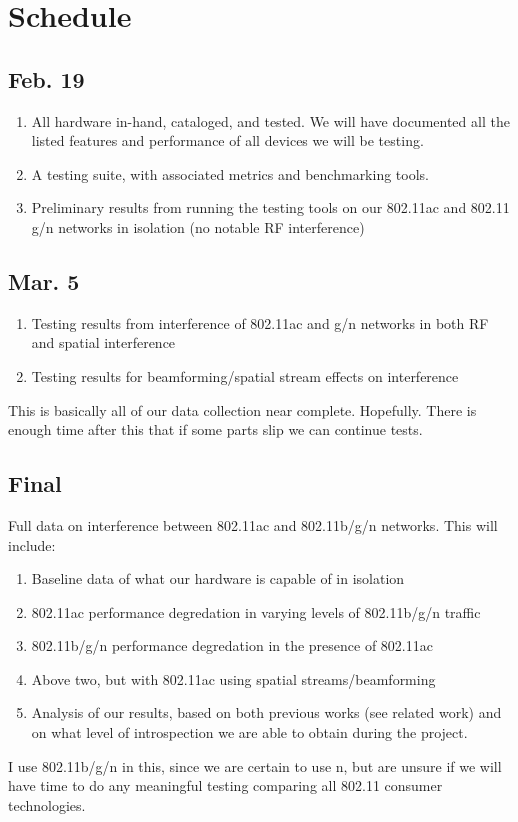 \section{Schedule}


\subsection{Feb. 19}
\begin{enumerate}
\item All hardware in-hand, cataloged, and tested. We will have documented all the listed features and performance of all devices we will be testing.
\item A testing suite, with associated metrics and benchmarking tools.
\item Preliminary results from running the testing tools on our 802.11ac and 802.11 g/n networks in isolation (no notable RF interference)
\end{enumerate}

\subsection{Mar. 5}
\begin{enumerate}
\item Testing results from interference of 802.11ac and g/n networks in both RF and spatial interference
\item Testing results for beamforming/spatial stream effects on interference
\end{enumerate}
This is basically all of our data collection near
complete. Hopefully. There is enough time after this that if some
parts slip we can continue tests.

\subsection{Final}
Full data on interference between 802.11ac and 802.11b/g/n networks. This will include:
\begin{enumerate}
\item Baseline data of what our hardware is capable of in isolation
\item 802.11ac performance degredation in varying levels of 802.11b/g/n traffic
\item 802.11b/g/n performance degredation in the presence of 802.11ac
\item Above two, but with 802.11ac using spatial streams/beamforming
\item Analysis of our results, based on both previous works (see
  related work) and on what level of introspection we are able to
  obtain during the project.
\end{enumerate}

I use 802.11b/g/n in this, since we are certain to use n, but are
unsure if we will have time to do any meaningful testing comparing all
802.11 consumer technologies.
